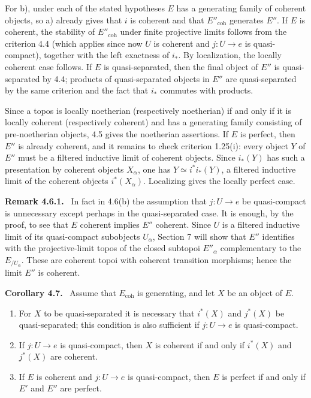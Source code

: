 \documentclass[11pt]{article}
\newcommand{\coh}{\mathrm{coh}}
\newenvironment{statement}[1]{\par\medskip\noindent\textbf{#1.}\ }{\par\medskip}
\newenvironment{remarktext}[1]{\par\medskip\noindent\textbf{#1.}\ }{\par\medskip}
\begin{document}
For b), under each of the stated hypotheses \(E\) has a generating family of coherent objects, so a) already gives that \(i\) is coherent and that \(E''_{\coh}\) generates \(E''\). If \(E\) is coherent, the stability of \(E''_{\coh}\) under finite projective limits follows from the criterion 4.4 (which applies since now \(U\) is coherent and \(j:U\to e\) is quasi-compact), together with the left exactness of \(i_*\). By localization, the locally coherent case follows. If \(E\) is quasi-separated, then the final object of \(E''\) is quasi-separated by 4.4; products of quasi-separated objects in \(E''\) are quasi-separated by the same criterion and the fact that \(i_*\) commutes with products.

Since a topos is locally noetherian (respectively noetherian) if and only if it is locally coherent (respectively coherent) and has a generating family consisting of pre-noetherian objects, 4.5 gives the noetherian assertions. If \(E\) is perfect, then \(E''\) is already coherent, and it remains to check criterion 1.25(i): every object \(Y\) of \(E''\) must be a filtered inductive limit of coherent objects. Since \(i_*(Y)\) has such a presentation by coherent objects \(X_\alpha\), one has \(Y\simeq i^*i_*(Y)\), a filtered inductive limit of the coherent objects \(i^*(X_\alpha)\). Localizing gives the locally perfect case.

\begin{remarktext}{Remark 4.6.1}
In fact in 4.6(b) the assumption that \(j:U\to e\) be quasi-compact is unnecessary except perhaps in the quasi-separated case. It is enough, by the proof, to see that \(E\) coherent implies \(E''\) coherent. Since \(U\) is a filtered inductive limit of its quasi-compact subobjects \(U_\alpha\), Section 7 will show that \(E''\) identifies with the projective-limit topos of the closed subtopoi \(E''_\alpha\) complementary to the \(E_{/U_\alpha}\). These are coherent topoi with coherent transition morphisms; hence the limit \(E''\) is coherent.
\end{remarktext}

\begin{statement}{Corollary 4.7}
Assume that \(E_{\coh}\) is generating, and let \(X\) be an object of \(E\).
\begin{enumerate}[label=\alph*)]
\item For \(X\) to be quasi-separated it is necessary that \(i^*(X)\) and \(j^*(X)\) be quasi-separated; this condition is also sufficient if \(j:U\to e\) is quasi-compact.
\item If \(j:U\to e\) is quasi-compact, then \(X\) is coherent if and only if \(i^*(X)\) and \(j^*(X)\) are coherent.
\item If \(E\) is coherent and \(j:U\to e\) is quasi-compact, then \(E\) is perfect if and only if \(E'\) and \(E''\) are perfect.
\end{enumerate}
\end{statement}
\end{document}
